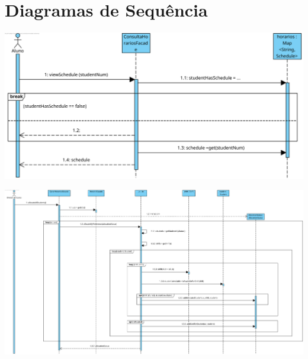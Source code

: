 \documentclass[a4paper,12pt]{scrreprt}
\begin{document}


\chapter{Diagramas de Sequência}
\vspace{1cm}

\begin{minipage}{\textwidth}
    \centering
    \includegraphics[width=1\textwidth]{images/sequence-diagrams/1-consultar-horario.png}
    \label{fig:7-1-diagrama_de_sequencia_consultar_horario}
\end{minipage}

\vspace{1cm}

\begin{minipage}{\textwidth}
    \centering
    \includegraphics[width=1\textwidth]{images/sequence-diagrams/2-gerar-horarios.png}
    \label{fig:7-2-diagrama_de_sequencia_gerar_horarios}
\end{minipage}
\end{document}
